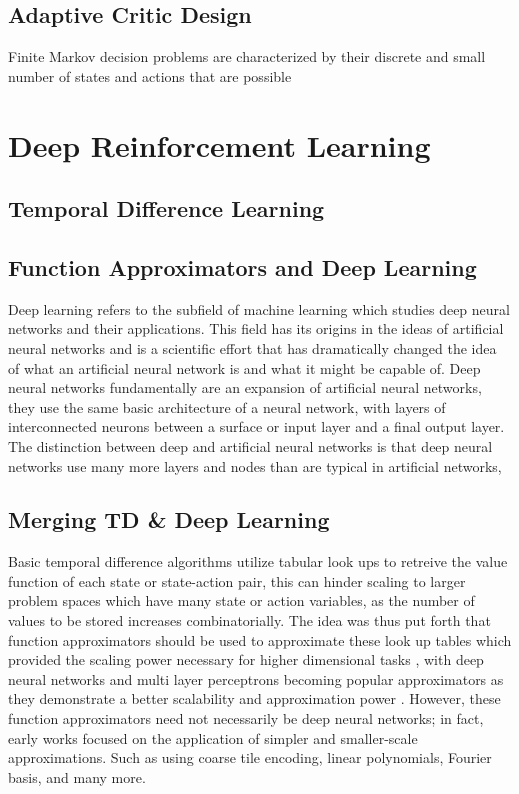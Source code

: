 \documentclass[../report.tex]{subfiles}
\begin{document}
\subsection{Adaptive Critic Design}

Finite Markov decision problems are characterized by their discrete and small number of states and actions that are possible


\section{Deep Reinforcement Learning}

\subsection{Temporal Difference Learning}

\subsection{Function Approximators and Deep Learning}

Deep learning refers to the subfield of machine learning which studies deep neural networks and their applications. This field has its origins in the ideas of artificial neural networks and is a scientific effort that has dramatically changed the idea of what an artificial neural network is and what it might be capable of. Deep neural networks fundamentally are an expansion of artificial neural networks, they use the same basic architecture of a neural network, with layers of interconnected neurons between a surface or input layer and a final output layer. The distinction between deep and artificial neural networks is that deep neural networks use many more layers and nodes than are typical in artificial networks,

\subsection{Merging TD \& Deep Learning}

Basic temporal difference algorithms utilize tabular look ups to retreive the value function of each state or state-action pair, this can hinder scaling to larger problem spaces which have many state or action variables, as the number of values to be stored increases combinatorially. The idea was thus put forth that function approximators should be used to approximate these look up tables which provided the scaling power necessary for higher dimensional tasks \cite{function_approximators}, with deep neural networks and multi layer perceptrons becoming popular approximators as they demonstrate a better scalability and approximation power \cite{drl_benchmarking, drl_atari, drl_humanlvl}. However, these function approximators need not necessarily be deep neural networks; in fact, early works focused on the application of simpler and smaller-scale approximations. Such as using coarse tile encoding, linear polynomials, Fourier basis, and many more.
\end{document}
